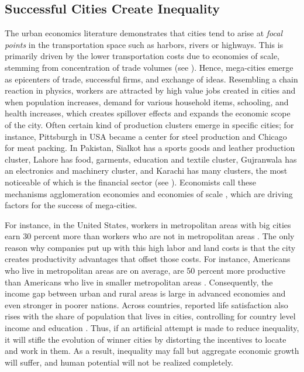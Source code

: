 \documentclass[12pt]{article}
\newcommand{\1}{\mathbbm 1}
\begin{document}
		
		
		
		
	
		
		

		
		\subsection{Successful Cities Create Inequality}
		
		
		The urban economics literature demonstrates that cities tend to arise at \textit{focal points} in the transportation space such as harbors, rivers or highways. This is primarily driven by the lower transportation costs due to economies of scale, stemming from concentration of trade volumes (see \cite{brueckner2011lectures}). Hence, mega-cities emerge as epicenters of trade, successful firms, and exchange of ideas. Resembling a chain reaction in physics, workers are attracted by high value jobs created in cities and when population increases, demand for various household items, schooling, and health increases, which creates spillover effects and expands the economic scope of the city. Often certain kind of production clusters emerge in specific cities; for instance, Pittsburgh in USA became a center for steel production and Chicago for meat packing. In Pakistan, Sialkot has a sports goods and leather production cluster, Lahore has food, garments, education and textile cluster, Gujranwala has an electronics and machinery cluster, and Karachi has many clusters, the most noticeable of which is the financial sector (see \cite{azhar2019effects}). Economists call these mechanisms agglomeration economies and economies of scale \cite{glaeser2013triumph}, which are driving factors for the success of mega-cities.
		
		
		For instance, in the United States, workers in metropolitan areas with big cities earn 30 percent more than workers who are not in metropolitan areas \cite{glaeser2008cities}. The only reason why companies put up with this high labor and land costs is that the city creates productivity advantages that offset those costs. For instance, Americans who live in metropolitan areas are on average, are 50 percent more productive than Americans who live in smaller metropolitan areas \cite{glaeser2013triumph}. Consequently, the income gap between urban and rural areas is large in advanced economies and even stronger in poorer nations. Across countries, reported life satisfaction also rises with the share of population that lives in cities, controlling for country level income and education \cite{glaeser2008cities}. Thus, if an artificial attempt is made to reduce inequality, it will stifle the evolution of winner cities by distorting the incentives to locate and work in them. As a result, inequality may fall but aggregate economic growth will suffer, and human potential will not be realized completely.
		
\end{document}
